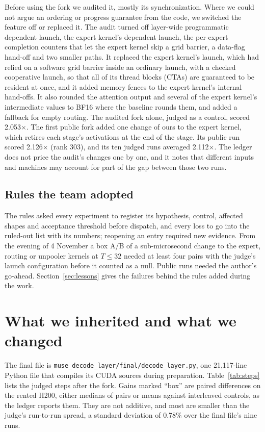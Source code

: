 \documentclass[11pt]{article}
\begin{document}
Before using the fork we audited it, mostly its synchronization. Where we could
not argue an ordering or progress guarantee from the code, we switched the
feature off or replaced it. The audit turned off layer-wide programmatic dependent
launch, the expert kernel's dependent launch, the per-expert completion counters
that let the expert kernel skip a grid barrier, a data-flag hand-off and two
smaller paths. It replaced the expert kernel's launch, which had relied on a
software grid barrier inside an ordinary launch, with a checked cooperative
launch, so that all of its thread blocks (CTAs) are guaranteed to be resident at
once, and it added memory fences to the expert kernel's internal hand-offs. It
also rounded the attention output and several of the expert kernel's
intermediate values to BF16 where the baseline rounds them, and added a fallback
for empty routing. The audited fork alone, judged as a control, scored
2.053$\times$. The first public fork added one change of ours to the expert
kernel, which retires each stage's activations at the end of the stage. Its public
run scored 2.126$\times$ (rank 303), and its ten judged runs averaged 2.112$\times$. The ledger does not price the audit's changes
one by one, and it notes that different inputs and machines may account for part
of the gap between those two runs.

\subsection{Rules the team adopted}

The rules asked every experiment to register its hypothesis, control, affected
shapes and acceptance threshold before dispatch, and every loss to go into the
ruled-out list with its numbers; reopening an entry required new evidence. From
the evening of 4 November a box A/B of a sub-microsecond change to the expert,
routing or unpooler kernels at $T\le32$ needed at least four pairs with the
judge's launch configuration before it counted as a null. Public runs needed the author's go-ahead.
Section~\ref{sec:lessons} gives the failures behind the rules added during the
work.

\section{What we inherited and what we changed}
\label{sec:opt}

The final file is \texttt{muse\_decode\_layer/final/decode\_layer.py}, one
21{,}117-line Python file that compiles its CUDA sources during preparation.
Table~\ref{tab:steps} lists the judged steps after the fork. Gains marked ``box''
are paired differences on the rented H200, either medians of pairs or means
against interleaved controls, as the ledger reports them. They are not additive,
and most are smaller than the judge's run-to-run spread, a standard deviation of
0.78\% over the final file's nine runs.
\end{document}

